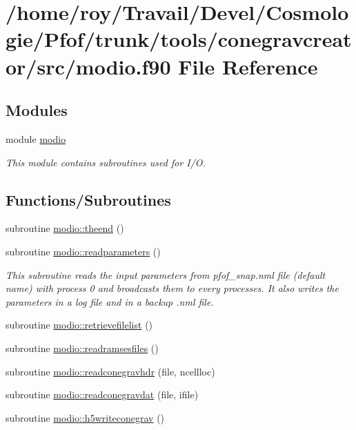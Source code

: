 \hypertarget{tools_2conegravcreator_2src_2modio_8f90}{}\section{/home/roy/\+Travail/\+Devel/\+Cosmologie/\+Pfof/trunk/tools/conegravcreator/src/modio.f90 File Reference}
\label{tools_2conegravcreator_2src_2modio_8f90}
\subsection*{Modules}
\begin{DoxyCompactItemize}
\item 
module \hyperlink{namespacemodio}{modio}
\begin{DoxyCompactList}\small\item\em This module contains subroutines used for I/O. \end{DoxyCompactList}\end{DoxyCompactItemize}
\subsection*{Functions/\+Subroutines}
\begin{DoxyCompactItemize}
\item 
subroutine \hyperlink{namespacemodio_a2688770b2d08498c14ef3212e61d74bf}{modio\+::theend} ()
\item 
subroutine \hyperlink{namespacemodio_aa5e6b5f45cf8cfc091e8e7ff25a97c68}{modio\+::readparameters} ()
\begin{DoxyCompactList}\small\item\em This subroutine reads the input parameters from pfof\+\_\+snap.\+nml file (default name) with process 0 and broadcasts them to every processes. It also writes the parameters in a log file and in a backup .nml file. \end{DoxyCompactList}\item 
subroutine \hyperlink{namespacemodio_a49a42a212fba0853ef61f4f3360e6cb8}{modio\+::retrievefilelist} ()
\item 
subroutine \hyperlink{namespacemodio_a65b2a30853dd9ec7641c578cb220a3fe}{modio\+::readramsesfiles} ()
\item 
subroutine \hyperlink{namespacemodio_a781355181afb550bcc570313df840da4}{modio\+::readconegravhdr} (file, ncellloc)
\item 
subroutine \hyperlink{namespacemodio_a5ac9b7de3c680868d2114731e0dd67f2}{modio\+::readconegravdat} (file, ifile)
\item 
subroutine \hyperlink{namespacemodio_a25a01a0565ebacb543ff8a55b5a51351}{modio\+::h5writeconegrav} ()
\end{DoxyCompactItemize}
